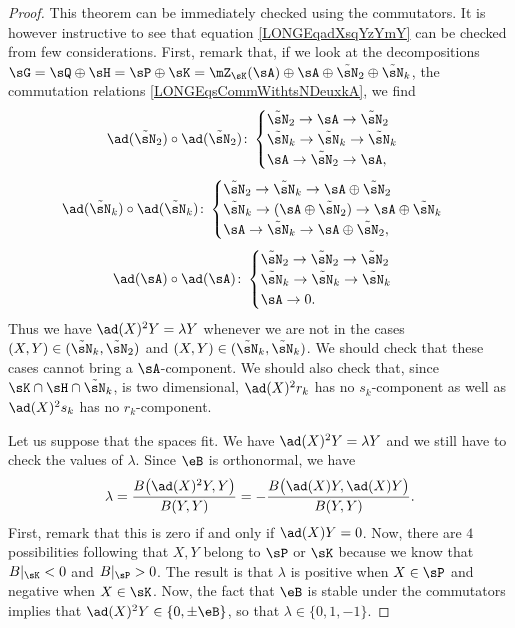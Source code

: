 \begin{proof}
	This theorem can be immediately checked using the commutators. It is however instructive to see that equation \eqref{LONGEqadXsqYzYmY} can be checked from few considerations. First, remark that, if we look at the decompositions $\sG=\sQ\oplus\sH=\sP\oplus\sK=\mZ_{\sK}(\sA)\oplus\sA\oplus\tilde\sN_2\oplus\tilde\sN_k$, the commutation relations \eqref{LONGEqsCommWithtsNDeuxkA}, we find
	\begin{equation}
		\ad(\tilde\sN_2)\circ\ad(\tilde\sN_2)\colon
		\begin{cases}
			\tilde\sN_2\to\sA\to\tilde\sN_2\\
			\tilde\sN_k\to\tilde\sN_k\to\tilde\sN_k\\
			\sA\to\tilde\sN_2\to\sA,
		\end{cases}
	\end{equation}
	\begin{equation}
		\ad(\tilde\sN_k)\circ\ad(\tilde\sN_k)\colon
		\begin{cases}
			\tilde\sN_2\to\tilde\sN_k\to\sA\oplus\tilde\sN_2\\
			\tilde\sN_k\to(\sA\oplus\tilde\sN_2)\to\sA\oplus\tilde\sN_k\\
			\sA\to\tilde\sN_k\to\sA\oplus\tilde\sN_2,
		\end{cases}
	\end{equation}
	\begin{equation}
		\ad(\sA)\circ\ad(\sA)\colon
		\begin{cases}
			\tilde\sN_2\to\tilde\sN_2\to\tilde\sN_2\\
			\tilde\sN_k\to\tilde\sN_k\to\tilde\sN_k\\
			\sA\to 0.
		\end{cases}
	\end{equation}
	Thus we have $\ad(X)^2Y=\lambda Y$ whenever we are not in the cases $(X,Y)\in(\tilde\sN_k,\tilde\sN_2)$ and $(X,Y)\in(\tilde\sN_k,\tilde\sN_k)$. We should check that these cases cannot bring a $\sA$-component. We should also check that, since $\sK\cap\sH\cap\tilde\sN_k$, is two dimensional, $\ad(X)^2r_k$ has no $s_k$-component as well as $\ad(X)^2s_k$ has no $r_k$-component.

	Let us suppose that the spaces fit. We have $\ad(X)^2Y=\lambda Y$ and we still have to check the values of $\lambda$. Since $\eB$ is orthonormal, we have
	\begin{equation}
		\lambda=\frac{ B\big( \ad(X)^2Y,Y \big) }{ B(Y,Y) }=-\frac{ B\big( \ad(X)Y,\ad(X)Y \big) }{ B(Y,Y) }.
	\end{equation}
	First, remark that this is zero if and only if $\ad(X)Y=0$. Now, there are $4$ possibilities following that $X,Y$ belong to $\sP$ or $\sK$ because we know that $B|_{\sK}<0$ and $B|_{\sP}>0$. The result is that $\lambda$ is positive when $X\in\sP$ and negative when $X\in\sK$. Now, the fact that $\eB$ is stable under the commutators implies that $\ad(X)^2Y\in\{ 0,\pm \eB \}$, so that $\lambda\in\{ 0,1,-1 \}$.
\end{proof}
